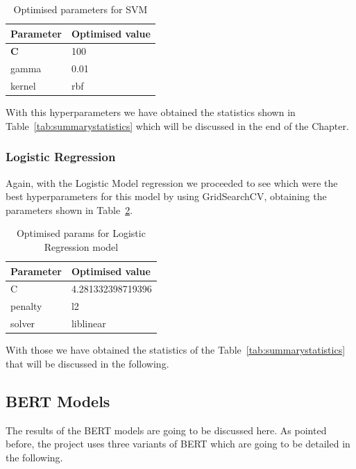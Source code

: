 \begin{table}[h]
\centering
\begin{tabular}{|l|l|}
\hline
\textbf{Parameter} & \textbf{Optimised value} \\ \hline
\textbf{C}         & 100                      \\ \hline
gamma              & 0.01                     \\ \hline
kernel             & rbf                      \\ \hline
\end{tabular}
\caption{Optimised parameters for SVM}
\label{tab:SVMoptimisedparams}
\end{table}

With this hyperparameters we have obtained the statistics shown in Table~\ref{tab:summarystatistics} which will be discussed in the end of the Chapter.


\subsubsection{Logistic Regression}
Again, with the Logistic Model regression we proceeded to see which were the best hyperparameters for this model by using GridSearchCV, obtaining the parameters shown in Table~\ref{tab:LRoptimisedparams}.

\begin{table}[]
\centering
\begin{tabular}{|l|l|}
\hline
\textbf{Parameter} & \textbf{Optimised value} \\ \hline
C                  & 4.281332398719396        \\ \hline
penalty            & l2                       \\ \hline
solver             & liblinear                \\ \hline
\end{tabular}
\caption{Optimised params for Logistic Regression model}
\label{tab:LRoptimisedparams}
\end{table}

With those we have obtained the statistics of the Table~\ref{tab:summarystatistics} that will be discussed in the following.


\subsection{BERT Models}
The results of the BERT models are going to be discussed here. As pointed before, the project uses three variants of BERT which are going to be detailed in the following. 


